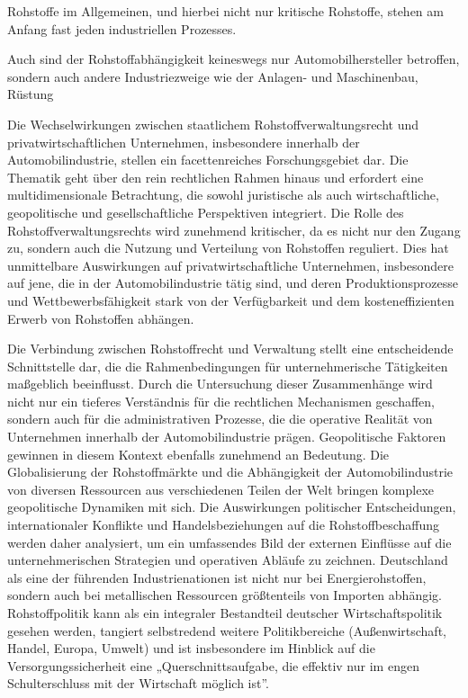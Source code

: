 \documentclass[12pt,a4paper,oneside]{book} %
\begin{document}
	Rohstoffe im Allgemeinen, und hierbei nicht nur kritische Rohstoffe, stehen am Anfang fast jeden industriellen Prozesses.
	
	Auch sind der Rohstoffabhängigkeit keineswegs nur Automobilhersteller betroffen, sondern auch andere Industriezweige wie der Anlagen- und Maschinenbau, Rüstung
	
	Die Wechselwirkungen zwischen staatlichem Rohstoffverwaltungsrecht und privatwirtschaftlichen Unternehmen, insbesondere innerhalb der Automobilindustrie, stellen ein facettenreiches Forschungsgebiet dar. Die Thematik geht über den rein rechtlichen Rahmen hinaus und erfordert eine multidimensionale Betrachtung, die sowohl juristische als auch wirtschaftliche, geopolitische und gesellschaftliche Perspektiven integriert. Die Rolle des Rohstoffverwaltungsrechts wird zunehmend kritischer, da es nicht nur den Zugang zu, sondern auch die Nutzung und Verteilung von Rohstoffen reguliert. Dies hat unmittelbare Auswirkungen auf privatwirtschaftliche Unternehmen, insbesondere auf jene, die in der Automobilindustrie tätig sind, und deren Produktionsprozesse und Wettbewerbsfähigkeit stark von der Verfügbarkeit und dem kosteneffizienten Erwerb von Rohstoffen abhängen.
	
	Die Verbindung zwischen Rohstoffrecht und Verwaltung stellt eine entscheidende Schnittstelle dar, die die Rahmenbedingungen für unternehmerische Tätigkeiten maßgeblich beeinflusst. Durch die Untersuchung dieser Zusammenhänge wird nicht nur ein tieferes Verständnis für die rechtlichen Mechanismen geschaffen, sondern auch für die administrativen Prozesse, die die operative Realität von Unternehmen innerhalb der Automobilindustrie prägen. Geopolitische Faktoren gewinnen in diesem Kontext ebenfalls zunehmend an Bedeutung. Die Globalisierung der Rohstoffmärkte und die Abhängigkeit der Automobilindustrie von diversen Ressourcen aus verschiedenen Teilen der Welt bringen komplexe geopolitische Dynamiken mit sich. Die Auswirkungen politischer Entscheidungen, internationaler Konflikte und Handelsbeziehungen auf die Rohstoffbeschaffung werden daher analysiert, um ein umfassendes Bild der externen Einflüsse auf die unternehmerischen Strategien und operativen Abläufe zu zeichnen. Deutschland als eine der führenden Industrienationen ist nicht nur bei Energierohstoffen, sondern auch bei metallischen Ressourcen größtenteils von Importen abhängig. \autocite{dauke_rohstoff-_2011} Rohstoffpolitik kann als ein integraler Bestandteil deutscher Wirtschaftspolitik gesehen werden, tangiert selbstredend weitere Politikbereiche (Außenwirtschaft, Handel, Europa, Umwelt) und ist insbesondere im Hinblick auf die Versorgungssicherheit eine „Querschnittsaufgabe, die effektiv nur im engen Schulterschluss mit der Wirtschaft möglich ist”.\autocite{dauke_rohstoff-_2011}
	
\end{document}
